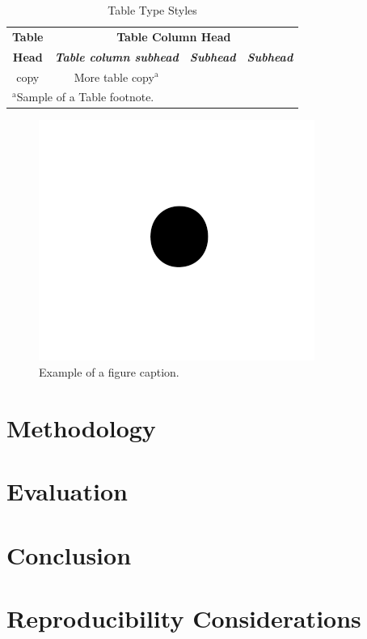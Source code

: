 \documentclass[conference]{IEEEtran}
\begin{document}
\begin{table}[htbp]
\caption{Table Type Styles}
\begin{center}
\begin{tabular}{|c|c|c|c|}
\hline
\textbf{Table}&\multicolumn{3}{|c|}{\textbf{Table Column Head}} \\
\cline{2-4} 
\textbf{Head} & \textbf{\textit{Table column subhead}}& \textbf{\textit{Subhead}}& \textbf{\textit{Subhead}} \\
\hline
copy& More table copy$^{\mathrm{a}}$& &  \\
\hline
\multicolumn{4}{l}{$^{\mathrm{a}}$Sample of a Table footnote.}
\end{tabular}
\label{tab1}
\end{center}
\end{table}

\begin{figure}[htbp]
\centerline{\includegraphics{fig1.png}}
\caption{Example of a figure caption.}
\label{fig}
\end{figure}

\section{Methodology}

\section{Evaluation}

\section{Conclusion}

\section{Reproducibility Considerations}
\end{document}
